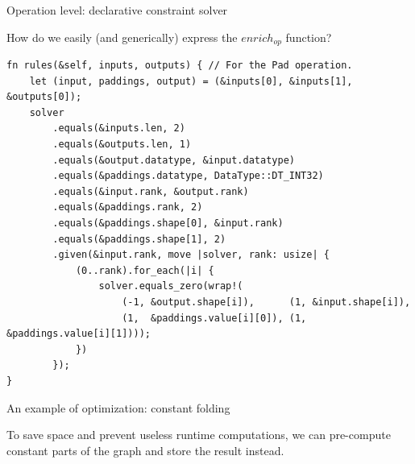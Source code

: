 \documentclass{beamer}
\begin{document}
\begin{frame}[fragile]{Operation level: declarative constraint solver}
    \begin{block}{}
    How do we easily (and generically) express the $enrich_{op}$ function?
    \end{block}
    \vspace{.5em}
    \scriptsize
    
    \begin{verbatim}
fn rules(&self, inputs, outputs) { // For the Pad operation.
    let (input, paddings, output) = (&inputs[0], &inputs[1], &outputs[0]);
    solver
        .equals(&inputs.len, 2)
        .equals(&outputs.len, 1)
        .equals(&output.datatype, &input.datatype)
        .equals(&paddings.datatype, DataType::DT_INT32)
        .equals(&input.rank, &output.rank)
        .equals(&paddings.rank, 2)
        .equals(&paddings.shape[0], &input.rank)
        .equals(&paddings.shape[1], 2)
        .given(&input.rank, move |solver, rank: usize| {
            (0..rank).for_each(|i| {
                solver.equals_zero(wrap!(
                    (-1, &output.shape[i]),      (1, &input.shape[i]),
                    (1,  &paddings.value[i][0]), (1, &paddings.value[i][1])));
            })
        });
}
    \end{verbatim}
\end{frame}

\begin{frame}{An example of optimization: constant folding}
    \small
    
    \begin{block}{}
    To save space and prevent useless runtime computations, we can pre-compute constant parts of the graph and store the result instead.
    \end{block}
    \vspace{1em}
    
    
\end{frame}
\end{document}
